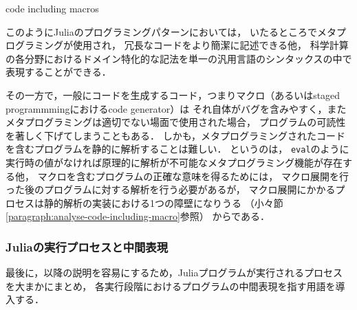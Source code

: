 \begin{listing}[ht]
  \inputminted[frame=lines, linenos, firstnumber=1, firstline=4, lastline=10]{julia}{src/jump.jl}
  \caption{code including macros}
  \label{lst:target2}
\end{listing}

このようにJuliaのプログラミングパターンにおいては，
いたるところでメタプログラミングが使用され\footnotemark，
冗長なコードをより簡潔に記述できる他，
科学計算の各分野におけるドメイン特化的な記法を単一の汎用言語のシンタックスの中で表現することができる\cite{jeff-phd}．


その一方で，一般にコードを生成するコード，つまりマクロ（あるいはstaged programmmingにおけるcode generator）は
それ自体がバグを含みやすく，またメタプログラミングは適切でない場面で使用された場合，
プログラムの可読性を著しく下げてしまうこともある．
しかも，メタプログラミングされたコードを含むプログラムを静的に解析することは難しい．
というのは，
\verb|eval|のように実行時の値がなければ原理的に解析が不可能なメタプログラミング機能が存在する他，
マクロを含むプログラムの正確な意味を得るためには，
マクロ展開を行った後のプログラムに対する解析を行う必要があるが，
マクロ展開にかかるプロセスは静的解析の実装における1つの障壁になりうる
（小々節\ref{paragraph:analyse-code-including-macro}参照）
からである．

\subsubsection*{Juliaの実行プロセスと中間表現} \label{subsubsection:eval-process}

最後に，以降の説明を容易にするため，Juliaプログラムが実行されるプロセスを大まかにまとめ，
各実行段階におけるプログラムの中間表現を指す用語を導入する\cite{eval-of-julia-code, julia-asts}．\\

